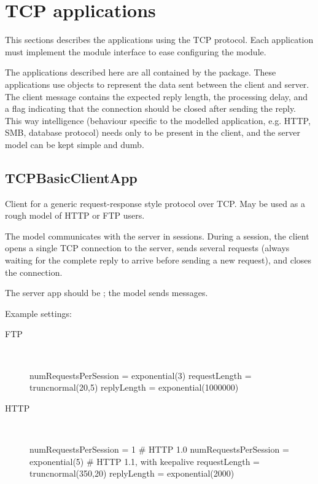 \section{TCP applications}

This sections describes the applications using the TCP protocol.
Each application must implement the  module interface
to ease configuring the  module.

The applications described here are all contained by the
 package. These applications use
 objects to represent the data sent between the client
and server. The client message contains the expected reply length, the
processing delay, and a flag indicating that the connection should be closed
after sending the reply. This way intelligence (behaviour specific to the
modelled application, e.g. HTTP, SMB, database protocol) needs only to be
present in the client, and the server model can be kept simple and dumb.


\subsection{TCPBasicClientApp}

Client for a generic request-response style protocol over TCP.
May be used as a rough model of HTTP or FTP users.

The model communicates with the server in sessions. During a session,
the client opens a single TCP connection to the server, sends several
requests (always waiting for the complete reply to arrive before
sending a new request), and closes the connection.

The server app should be ; the model sends
 messages.

Example settings:

\begin{description}
\item[FTP] \quad \\

\begin{inifile}
numRequestsPerSession = exponential(3)
requestLength = truncnormal(20,5)
replyLength = exponential(1000000)
\end{inifile}

\item[HTTP] \quad \\

\begin{inifile}
numRequestsPerSession = 1 # HTTP 1.0
numRequestsPerSession = exponential(5)  # HTTP 1.1, with keepalive
requestLength = truncnormal(350,20)
replyLength = exponential(2000)
\end{inifile}

\end{description}

